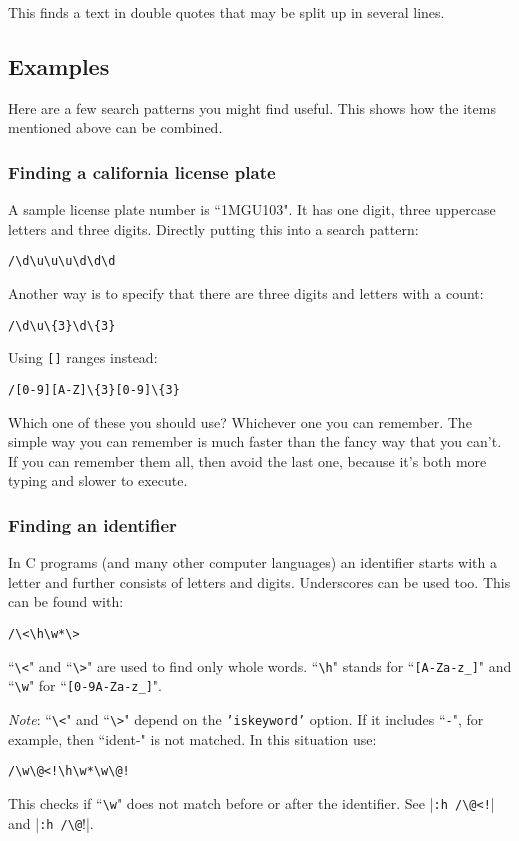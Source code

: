 This finds a text in double quotes that may be split up in several lines.
\subsection{Examples}
Here are a few search patterns you might find useful.
This shows how the items mentioned above can be combined.

\subsubsection{Finding a california license plate}
A sample license plate number is ``1MGU103".
It has one digit, three uppercase letters and three digits.
Directly putting this into a search pattern:

\begin{Verbatim}[samepage=true]
 /\d\u\u\u\d\d\d
\end{Verbatim}

Another way is to specify that there are three digits and letters with a count:

\begin{Verbatim}[samepage=true]
 /\d\u\{3}\d\{3}
\end{Verbatim}

Using \texttt{[]} ranges instead:

\begin{Verbatim}[samepage=true]
 /[0-9][A-Z]\{3}[0-9]\{3}
\end{Verbatim}

Which one of these you should use?  Whichever one you can remember.
The simple way you can remember is much faster than the fancy way that you can't.
If you can remember them all, then avoid the last one, because it's both more typing and slower to execute.

\subsubsection{Finding an identifier}
In C programs (and many other computer languages) an identifier starts with a letter and further consists of letters and digits.
Underscores can be used too.
This can be found with:

\begin{Verbatim}[samepage=true]
 /\<\h\w*\>
\end{Verbatim}

``\texttt{\textbackslash{}<}" and ``\texttt{\textbackslash{}>}" are used to find only whole words.
``\texttt{\textbackslash{}h}" stands for ``\texttt{[A-Za-z\_]}" and ``\texttt{\textbackslash{}w}" for ``\texttt{[0-9A-Za-z\_]}".

\emph{Note}:
``\texttt{\textbackslash{}<}" and ``\texttt{\textbackslash{}>}" depend on the \texttt{'iskeyword'} option.
If it includes ``\texttt{-}", for example, then ``ident-" is not matched.
In this situation use:

\begin{Verbatim}[samepage=true]
     /\w\@<!\h\w*\w\@!
\end{Verbatim}
 
This checks if ``\texttt{\textbackslash{}w}" does not match before or after the identifier.
See |\texttt{:h /\textbackslash{}@<!}| and |\texttt{:h /\textbackslash{}@}!|.
\clearpage
